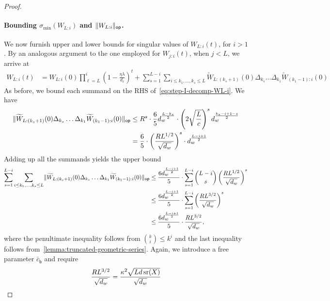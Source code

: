 \begin{proof}
  \paragraph{Bounding $\sigma_{\min}(W_{L:i})$ and $\lVert W_{L:i}\rVert_{\mathsf{op}}$.}
  We now furnish upper and lower bounds for singular values of $W_{L:i}(t)$, for $i > 1$. By an analogous
  argument to the one employed for $W_{j:i}(t)$, when $j < L$, we arrive at
  \begin{align}
      W_{L:i}(t) &= {W}_{L:i}(0) \prod_{\ell = L}^{i} \left(1 - \frac{\eta \lambda}{d_{\ell}}\right)^{t} +
      \sum_{s = 1}^{L - i} \sum_{i \leq k_{1}, \dots, k_{s} \leq L}
      \widetilde{W}_{L:(k_{s}+1)}(0) \Delta_{k_{s}} \dots \Delta_{k_{1}}
      \widetilde{W}_{(k_{1} - 1):i}(0)
      \label{eq:step-I-decomp-WL-i}
  \end{align}
  As before, we bound each summand on the RHS of~\eqref{eq:step-I-decomp-WL-i}. We have
  \begin{align*}
      \lVert\widetilde{W}_{L:(k_{s}+1)}(0) \Delta_{k_{s}} \dots \Delta_{k_{1}}
      \widetilde{W}_{(k_{1} - 1):i}(0)\rVert_{\mathsf{op}}  &\leq
     R^s
      \cdot \frac{6}{5} d_{w}^{\frac{L - k_{s}}{2}}
      \cdot \left(2 \sqrt{\frac{L}{c}} \right)^{s}
      d_{w}^{\frac{k_{s} - i + 1 - s}{2}} \\ &=
      \frac{6}{5} \cdot
      \left( \frac{R L^{1/2}}{\sqrt{d_w}} \right)^{s} \cdot d_{w}^{\frac{L - i + 1}{2}}
  \end{align*}
  Adding up all the summands yields the upper bound
  \begin{align*}
       \sum_{s = 1}^{L - i} \sum_{i \leq k_{1}, \dots, k_{s} \leq L}
      \lVert\widetilde{W}_{L:(k_{s}+1)}(0) \Delta_{k_{s}} \dots \Delta_{k_{1}}
      \widetilde{W}_{(k_{1} - 1):i}(0)\rVert_{\mathsf{op}}  &\leq
      \frac{6 d_{w}^{\frac{L - i + 1}{2}}}{5} \cdot \sum_{s = 1}^{L - i} \binom{L - i}{s}
      \left( \frac{R L^{1/2}}{\sqrt{d_w}} \right)^{s} \\
      &\leq
      \frac{6 d_{w}^{\frac{L - i + 1}{2}}}{5} \cdot
      \sum_{s = 1}^{L - i}
      \left( \frac{R L^{3/2}}{\sqrt{d_w}} \right)^{s} \\ &\leq
      \frac{6 d_{w}^{\frac{L - i + 1}{2}}}{5} \cdot
      \frac{R L^{3/2}}{\sqrt{d_w}},
  \end{align*}
  where the penultimate inequality follows from $\binom{k}{i} \leq k^{i}$ and the last
  inequality follows from~\cref{lemma:truncated-geometric-series}. Again, we introduce a free parameter
  $\bar{c}_{\mathsf{b}}$ and require
  \[ \frac{R L^{3/2}}{\sqrt{d_w}} = 
    \frac{\kappa^2 \sqrt{L d \operatorname{\mathrm{sr}}(X)}}{\sqrt{ d_{w}}} 
\]
\end{proof}
